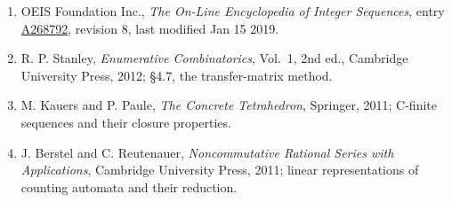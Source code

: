 \documentclass[11pt]{article}
\theoremstyle{definition}
\begin{document}
\begin{enumerate}

\item OEIS Foundation Inc., \emph{The On-Line Encyclopedia of Integer Sequences}, entry \href{https://oeis.org/A268792}{A268792}, revision 8, last modified Jan 15 2019.

\item R. P. Stanley, \emph{Enumerative Combinatorics}, Vol.~1, 2nd ed., Cambridge University Press, 2012; \S4.7, the transfer-matrix method.

\item M. Kauers and P. Paule, \emph{The Concrete Tetrahedron}, Springer, 2011; C-finite sequences and their closure properties.

\item J. Berstel and C. Reutenauer, \emph{Noncommutative Rational Series with Applications}, Cambridge University Press, 2011; linear representations of counting automata and their reduction.

\end{enumerate}
\end{document}
